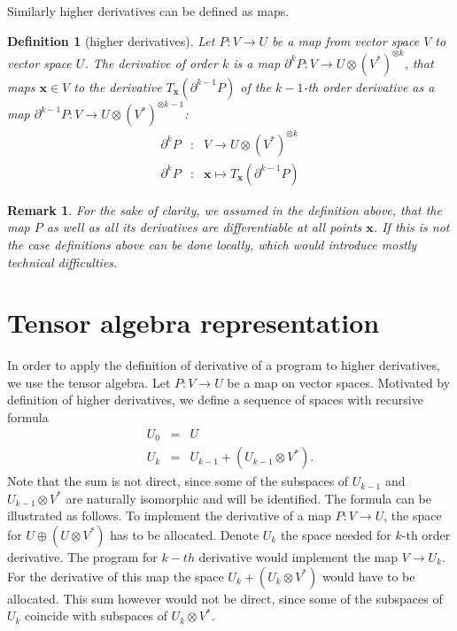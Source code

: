 \documentclass{article}
\newcommand{\x}{\mathbf{x}}
\newcommand{\D}{\partial}
\newtheorem{definicija}{Definition}[section]
\newtheorem{opomba}{Remark}[section]
\begin{document}
Similarly higher derivatives can be defined as maps.
\begin{definicija}[higher derivatives]
  Let $P:V\to U$ be a map from vector space $V$ to vector space $U$. 
The derivative of order $k$ is a map $\D^kP:V\to U\otimes(V^*)^{\otimes k}$,
that maps $\x\in V$ to the derivative  $T_\x(\D^{k-1}P)$ of the $k-1$-th order
derivative as a map $\D^{k-1}P: V\to U\otimes (V^*)^{\otimes k-1}$:
  \begin{eqnarray}\label{eq:partial}
    \label{eq:visji_odvod}
    \D^kP&:&V\to U\otimes (V^*)^{\otimes k}\\
    \D^kP&:&\x\mapsto T_\x\left( \D^{k-1}P \right)
  \end{eqnarray}
\end{definicija} 
\begin{opomba}
  For the sake of clarity, we assumed in the definition above, that the map $P$ as well as all its
  derivatives are differentiable at all points $\x$. If this is not the case
  definitions above can be done locally, which would introduce mostly technical difficulties.
\end{opomba}

\section{Tensor algebra representation}
In order to apply the definition of derivative of a program to higher
derivatives, we use the tensor algebra.
Let $P:V\to U$ be a map on vector spaces. Motivated by definition of higher
derivatives, we define a sequence of spaces with
recursive formula
\begin{eqnarray}
  \label{eq:universal_space}
  U_0 &=& U\\
  U_k &=& U_{k-1}+\left(U_{k-1}\otimes V^*\right).
\end{eqnarray}
Note that the sum is not direct, since some of the subspaces of $U_{k-1}$ and
$U_{k-1}\otimes V^*$ are naturally isomorphic and will be identified.
The formula can be illustrated as follows. 
To implement the derivative of a map $P:V\to U$, the space for $U\oplus
(U\otimes V^*)$ has to be allocated.
Denote $U_k$ the space needed for $k$-th order derivative. The program for
$k-th$ derivative would implement the map $V\to U_k$. For the derivative of this map
the space $U_k+ (U_k\otimes V^*)$ would have to be allocated. This sum
however would not be direct, since some of the subspaces of $U_k$ coincide with
subspaces of $U_k\otimes V^*$.
\end{document}
